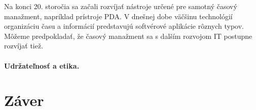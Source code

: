 \documentclass[10pt,slovak,a4paper]{article}
\begin{document}
		Na konci 20. storočia sa začali rozvíjať nástroje určené pre samotný časový manažment, napríklad prístroje PDA. V dnešnej dobe väčšinu technológií organizáciu času a informácií predstavujú softvérové aplikácie rôznych typov. Môžeme predpokladať, že časový manažment sa s dalším rozvojom IT postupne rozvíjať tiež.
		
		\paragraph{Udržateľnosť a etika.}
		
		
\section{Záver}



\end{document}
